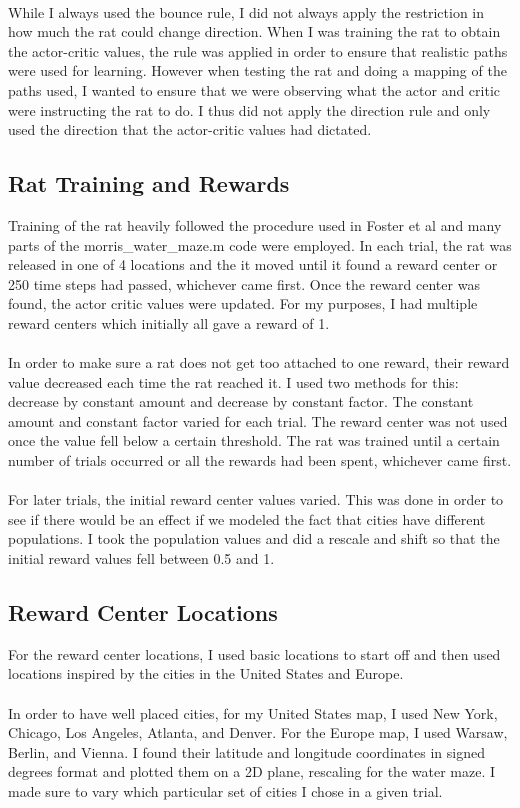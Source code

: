 \documentclass[conference]{IEEEtran}
\begin{document}
\\
While I always used the bounce rule, I did not always apply the restriction in how much the rat could change direction. When I was training the rat to obtain the actor-critic values, the rule was applied in order to ensure that realistic paths were used for learning. However when testing the rat and doing a mapping of the paths used, I wanted to ensure that we were observing what the actor and critic were instructing the rat to do. I thus did not apply the direction rule and only used the direction that the actor-critic values had dictated. 

\subsection{Rat Training and Rewards}

Training of the rat heavily followed the procedure used in Foster et al \cite{foster} and many parts of the morris\_water\_maze.m code were employed. In each trial, the rat was released in one of 4 locations and the it moved until it found a reward center or 250 time steps had passed, whichever came first. Once the reward center was found, the actor critic values were updated. For my purposes, I had multiple reward centers which initially all gave a reward of 1.\\
\\
In order to make sure a rat does not get too attached to one reward, their reward value decreased each time the rat reached it. I used two methods for this: decrease by constant amount and decrease by constant factor. The constant amount and constant factor varied for each trial. The reward center was not used once the value fell below a certain threshold. The rat was trained until a certain number of trials occurred or all the rewards had been spent, whichever came first. \\
\\
For later trials, the initial reward center values varied. This was done in order to see if there would be an effect if we modeled the fact that cities have different populations. I took the population values and did a rescale and shift so that the initial reward values fell between 0.5 and 1. 

\subsection{Reward Center Locations}
For the reward center locations, I used basic locations to start off and then used locations inspired by the cities in the United States and Europe. \\
\\
In order to have well placed cities, for my United States map, I used New York, Chicago, Los Angeles, Atlanta, and Denver. For the Europe map, I used Warsaw, Berlin, and Vienna. I found their latitude and longitude coordinates in signed degrees format and plotted them on a 2D plane, rescaling for the water maze. I made sure to vary which particular set of cities I chose in a given trial. 
\end{document}
